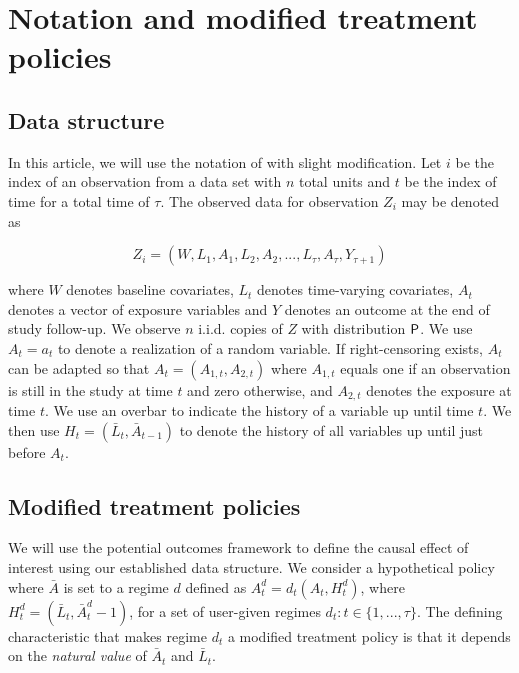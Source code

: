 \documentclass[]{jss}
\begin{document}
\hypertarget{notation-and-modified-treatment-policies}{%
\section{Notation and modified treatment
policies}\label{notation-and-modified-treatment-policies}}

\hypertarget{data-structure}{%
\subsection{Data structure}\label{data-structure}}

In this article, we will use the notation of
\citet{diazNonparametricCausalEffects2020a} with slight modification.
Let \(i\) be the index of an observation from a data set with \(n\)
total units and \(t\) be the index of time for a total time of \(\tau\).
The observed data for observation \(Z_i\) may be denoted as

\begin{equation}
Z_i = (W, L_1, A_1, L_2, A_2, ..., L_{\tau}, A_{\tau}, Y_{\tau + 1}) 
\end{equation}

where \(W\) denotes baseline covariates, \(L_t\) denotes time-varying
covariates, \(A_t\) denotes a vector of exposure variables and \(Y\)
denotes an outcome at the end of study follow-up. We observe \(n\)
i.i.d. copies of \(Z\) with distribution \(\mathsf{P}\). We use \(A_t = a_t\) to
denote a realization of a random variable. If right-censoring
exists, \(A_t\) can be adapted so that \(A_t = (A_{1, t}, A_{2, t})\)
where \(A_{1, t}\) equals one if an observation is still in the study at
time \(t\) and zero otherwise, and \(A_{2, t}\) denotes the exposure at
time \(t\). We use an overbar to indicate the history of a variable up
until time \(t\). We
then use \(H_t = (\bar{L}_t, \bar{A}_{t-1})\) to denote the history of
all variables up until just before \(A_t\).

\hypertarget{modified-treatment-policies}{%
\subsection{Modified treatment
policies}\label{modified-treatment-policies}}

We will use the potential outcomes framework to define the causal effect
of interest using our established data structure. We consider
a hypothetical policy where \(\bar{A}\) is set to a
regime \(d\) defined as \(A^{d}_t = d_t(A_t, H^{d}_t)\),
where \(H^{d}_t = (\bar{L}_t, \bar{A}^{d}_t - 1)\), for a set of
user-given regimes \(d_t:t \in \{1, ..., \tau\}\). The defining
characteristic that makes regime \(d_t\) a modified treatment policy is
that it depends on the \emph{natural value} of \(\bar{A}_t\) and
\(\bar{L}_t\).
\end{document}
